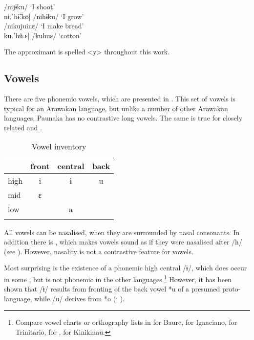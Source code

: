 \ea\label{ex:j-h}
\ea     \tab[ni.ˈjɨ.kʊ] \tab\tab /nijɨku/ \tab ‘I shoot’\\
     \tab{[}ni.ˈhɨ̃.kʊ] \tab\tab /nihɨku/ \tab ‘I grow’\\
\ex     \tab[ni.kʊ.ˈjui.nɛ] \tab /nikujuinɛ/ \tab ‘I make bread’\\
     \tab{[}ku.ˈhũ.ɛ] \tab\tab /kuhuɛ/ \tab ‘cotton’\\%
\z
   \xe

The approximant is spelled <y> throughout this work.

\subsection{Vowels}\label{Vowels}

There are five phonemic vowels, which are presented in . This set of vowels is typical for an Arawakan language, but unlike a number of other Arawakan languages, Paunaka has no contrastive long vowels. The same is true for closely related  and  \citep[cf.][76, 78]{Aikhenvald1999}.

\begin{table}
\caption{Vowel inventory}

\begin{tabular}{lccc}
\lsptoprule
 & front & central & back \\
\midrule high & i & ɨ & u \\
 mid & ɛ & & \\
 low & & a & \\
\lspbottomrule
\end{tabular}

\label{table:vowels}
\end{table}%


All vowels can be nasalised, when they are surrounded by nasal consonants. In addition there is , which makes vowels sound as if they were nasalised after /h/ (see ). However, nasality is not a contrastive feature for vowels.

Most surprising is the existence of a phonemic high central /ɨ/, which does occur in some  \citep[cf.][78]{Aikhenvald1999}, but is not phonemic in the other  languages.\footnote{Compare vowel charts or orthography lists in \citet[33]{Danielsen2007} for Baure, \citet[9]{OlzaZubiri2004} for Ignaciano, \citet[12--13]{Rose2021} for Trinitario, \citet[9]{ButlerEkdahl2012} for , \citet[63]{Souza2008} for Kinikinau.}
 However, it has been shown that /ɨ/ results from fronting of the back vowel *u of a presumed proto-language, while /u/ derives from *o (\citealt[]{deCarvalhoPAU}; \citealp[]{RamirezFranca2019}).

